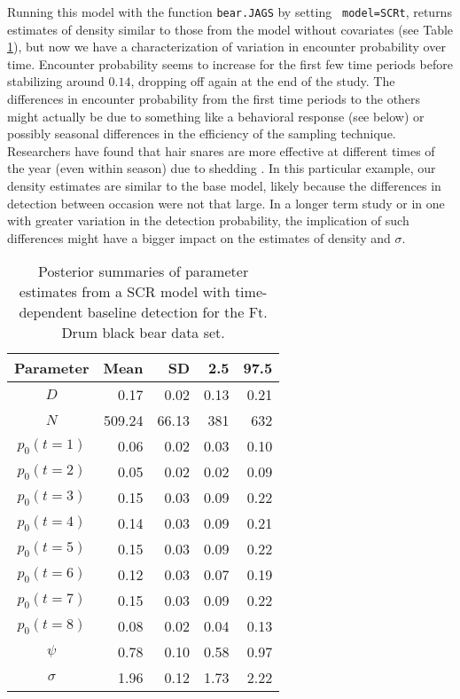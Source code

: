 Running this model with the function {\tt bear.JAGS} by setting {\tt
  model=SCRt}, returns estimates of density similar to those from the model 
  without covariates (see Table \ref{covariates.tab.SCRt}), but
now we have a characterization of variation in encounter probability
over time.  Encounter probability seems to increase for the first few
time periods before stabilizing around $0.14$, dropping off again at
the end of the study.  The differences in encounter probability from
the first time periods to the others might actually be due to
something like a behavioral response (see below) or possibly seasonal
differences in the efficiency of the sampling technique.  Researchers
have found that hair snares are more effective at different times of
the year (even within season) due to shedding
\citep{wegan_etal:inpress}.  In this particular example, our density
estimates are similar to the base model, likely because the
differences in detection between occasion were not that large.  In a
longer term study or in one with greater variation in the detection
probability, the implication of such differences might have a bigger
impact on the estimates of density and $\sigma$.

\begin{table}[ht]
\centering
\caption{Posterior summaries of parameter estimates from a SCR model with time-dependent baseline detection for the Ft. Drum black bear data set.}
\begin{tabular}{crrrr}
\hline
Parameter & Mean & SD & 2.5 & 97.5 \\
\hline
$D$           &    0.17     &  0.02    & 0.13 & 0.21 \\
$N$           &   509.24 &  66.13  & 381  & 632  \\
$p_0 (t=1)$  &    0.06     & 0.02     & 0.03  & 0.10  \\
$p_0 (t=2)$  &    0.05  & 0.02  &      0.02 & 0.09  \\
$p_0 (t=3)$  &    0.15 &  0.03  &     0.09 & 0.22  \\
$p_0 (t=4)$  &    0.14 &  0.03  &     0.09 & 0.21  \\
$p_0 (t=5)$  &    0.15 &  0.03  &    0.09 &  0.22  \\
$p_0 (t=6)$  &    0.12 &  0.03  &    0.07 & 0.19  \\
$p_0 (t=7)$  &    0.15 &  0.03  &    0.09 & 0.22  \\
$p_0 (t=8)$  &    0.08 &  0.02  &    0.04 & 0.13  \\
$\psi$  &   0.78 &  0.10  &  0.58 & 0.97  \\
$\sigma$ & 1.96 &  0.12  &   1.73 & 2.22  \\
\end{tabular}
\label{covariates.tab.SCRt}
\end{table}

